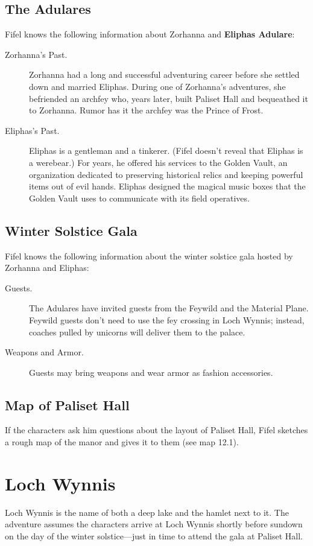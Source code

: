 \documentclass[10pt,a4paper,twoside,bg=print,twocolumn,openany,nodeprecatedcode]{dndbook}
\begin{document}
\subsection{The Adulares}
Fifel knows the following information about Zorhanna and \textbf{Eliphas Adulare}:


\begin{description}
\item[Zorhanna's Past.]
Zorhanna had a long and successful adventuring career before she settled down and married Eliphas. During one of Zorhanna's adventures, she befriended an archfey who, years later, built Paliset Hall and bequeathed it to Zorhanna. Rumor has it the archfey was the Prince of Frost.
\item[Eliphas's Past.]
Eliphas is a gentleman and a tinkerer. (Fifel doesn't reveal that Eliphas is a werebear.) For years, he offered his services to the Golden Vault, an organization dedicated to preserving historical relics and keeping powerful items out of evil hands. Eliphas designed the magical music boxes that the Golden Vault uses to communicate with its field operatives.
\end{description}

\subsection{Winter Solstice Gala}
Fifel knows the following information about the winter solstice gala hosted by Zorhanna and Eliphas:


\begin{description}
\item[Guests.]
The Adulares have invited guests from the Feywild and the Material Plane. Feywild guests don't need to use the fey crossing in Loch Wynnis; instead, coaches pulled by unicorns will deliver them to the palace.
\item[Weapons and Armor.]
Guests may bring weapons and wear armor as fashion accessories.
\end{description}

\subsection{Map of Paliset Hall}
If the characters ask him questions about the layout of Paliset Hall, Fifel sketches a rough map of the manor and gives it to them (see map 12.1).

\section{Loch Wynnis}
Loch Wynnis is the name of both a deep lake and the hamlet next to it. The adventure assumes the characters arrive at Loch Wynnis shortly before sundown on the day of the winter solstice—just in time to attend the gala at Paliset Hall.
\end{document}
